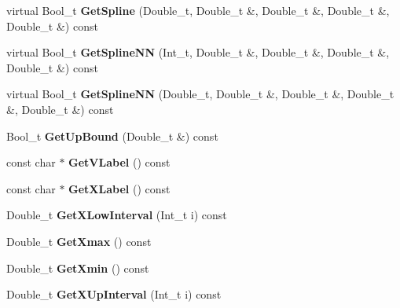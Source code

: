 \begin{DoxyCompactItemize}
\item 
\hypertarget{classTSplineFit_ae99ef60ad1ae1c5135b80f2ae02252f1}{
virtual Bool\_\-t {\bfseries GetSpline} (Double\_\-t, Double\_\-t \&, Double\_\-t \&, Double\_\-t \&, Double\_\-t \&) const }
\label{classTSplineFit_ae99ef60ad1ae1c5135b80f2ae02252f1}

\item 
\hypertarget{classTSplineFit_ac3fa3716c48104f30fcccc61de928a95}{
virtual Bool\_\-t {\bfseries GetSplineNN} (Int\_\-t, Double\_\-t \&, Double\_\-t \&, Double\_\-t \&, Double\_\-t \&) const }
\label{classTSplineFit_ac3fa3716c48104f30fcccc61de928a95}

\item 
\hypertarget{classTSplineFit_a37410bb337b4a7e702d7ce3ac7dfdc6e}{
virtual Bool\_\-t {\bfseries GetSplineNN} (Double\_\-t, Double\_\-t \&, Double\_\-t \&, Double\_\-t \&, Double\_\-t \&) const }
\label{classTSplineFit_a37410bb337b4a7e702d7ce3ac7dfdc6e}

\item 
\hypertarget{classTSplineFit_a263d0e66b822b4e51e2f6b33cb173496}{
Bool\_\-t {\bfseries GetUpBound} (Double\_\-t \&) const }
\label{classTSplineFit_a263d0e66b822b4e51e2f6b33cb173496}

\item 
\hypertarget{classTSplineFit_a6809425984906a55741c0efd4c867fd4}{
const char $\ast$ {\bfseries GetVLabel} () const }
\label{classTSplineFit_a6809425984906a55741c0efd4c867fd4}

\item 
\hypertarget{classTSplineFit_ade7f58f735178db7f90f380975475964}{
const char $\ast$ {\bfseries GetXLabel} () const }
\label{classTSplineFit_ade7f58f735178db7f90f380975475964}

\item 
\hypertarget{classTSplineFit_a8b44e467188c0826da7f291784fadfb2}{
Double\_\-t {\bfseries GetXLowInterval} (Int\_\-t i) const }
\label{classTSplineFit_a8b44e467188c0826da7f291784fadfb2}

\item 
\hypertarget{classTSplineFit_a04cf2186172686958007569cab5e804b}{
Double\_\-t {\bfseries GetXmax} () const }
\label{classTSplineFit_a04cf2186172686958007569cab5e804b}

\item 
\hypertarget{classTSplineFit_aeb1bb3490e4dbd4423972eb8bbd3398b}{
Double\_\-t {\bfseries GetXmin} () const }
\label{classTSplineFit_aeb1bb3490e4dbd4423972eb8bbd3398b}

\item 
\hypertarget{classTSplineFit_a6757a51c9125702c97c0d66635b4ffaa}{
Double\_\-t {\bfseries GetXUpInterval} (Int\_\-t i) const }
\label{classTSplineFit_a6757a51c9125702c97c0d66635b4ffaa}


\end{DoxyCompactItemize}
